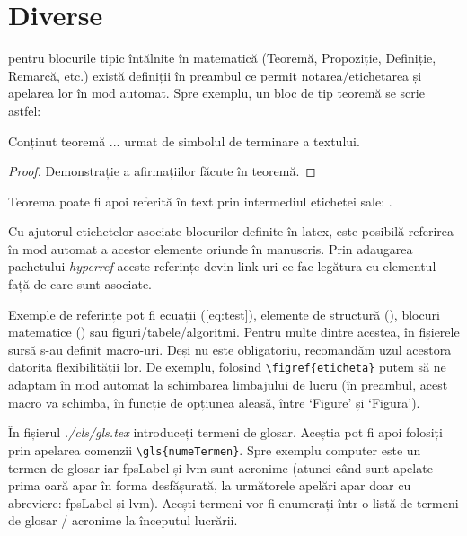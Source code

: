 \section{Diverse}

\begin{description}[style=nextline]
\item[blocuri matematice] pentru blocurile tipic întălnite în matematică (Teoremă, Propoziție, Definiție, Remarcă, etc.) există definiții în preambul ce permit notarea/etichetarea și apelarea lor în mod automat. Spre exemplu, un bloc de tip teoremă se scrie astfel:

\begin{thm}
\label{thm:test}
Conținut teoremă ... urmat de simbolul de terminare a textului. \eot
\end{thm}
\begin{proof}
Demonstrație a afirmațiilor făcute în teoremă.
\end{proof}
Teorema poate fi apoi referită în text prin intermediul etichetei sale: .
\item[referințe în text]
Cu ajutorul etichetelor asociate blocurilor definite în latex, este posibilă referirea în mod automat a acestor elemente oriunde în manuscris. Prin adaugarea pachetului \emph{hyperref} aceste referințe devin link-uri ce fac legătura cu elementul față de care sunt asociate.
 
Exemple de referințe pot fi ecuații (\eqref{eq:test}), elemente de structură (), blocuri matematice () sau figuri/tabele/algoritmi. Pentru multe dintre acestea,  în fișierele sursă s-au definit macro-uri. Deși nu este obligatoriu, recomandăm uzul acestora datorita flexibilității lor. De exemplu, folosind \verb+\figref{eticheta}+ putem să ne adaptam în mod automat la schimbarea limbajului de lucru (în preambul, acest macro va schimba, în funcție de opțiunea aleasă, între `Figure' și `Figura').

\item[termeni de glosar, acronime]
În fișierul \emph{./cls/gls.tex} introduceți termeni de glosar. Aceștia pot fi apoi folosiți prin apelarea comenzii \verb+\gls{numeTermen}+. Spre exemplu \gls{computer} este un termen de glosar iar \gls{fpsLabel} și \gls{lvm} sunt acronime (atunci când sunt apelate prima oară apar în forma desfășurată, la următorele apelări apar doar cu abreviere: \gls{fpsLabel} și \gls{lvm}). Acești termeni vor fi enumerați într-o listă de termeni de glosar / acronime la începutul lucrării.


\end{description}
